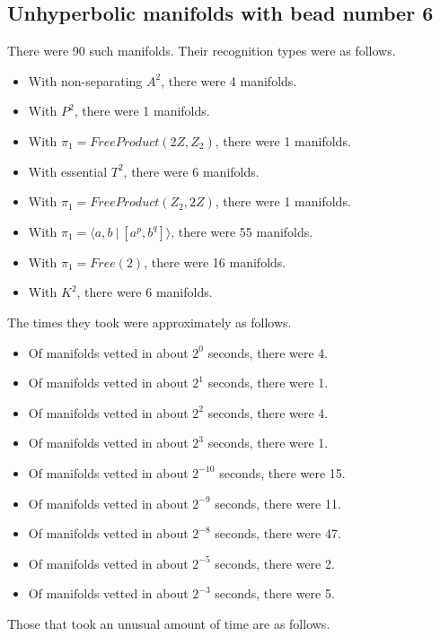 \documentclass{article}
\begin{document}
\subsection{Unhyperbolic manifolds with bead number 6}
There were 90 such manifolds.
Their recognition types were as follows.
\begin{itemize}
\item With non-separating $A^2$, there were 4 manifolds.
\item With $P^2$, there were 1 manifolds.
\item With $\pi_1 =FreeProduct( 2 Z, Z_2 )$, there were 1 manifolds.
\item With essential $T^2$, there were 6 manifolds.
\item With $\pi_1 =FreeProduct( Z_2, 2 Z )$, there were 1 manifolds.
\item With $\pi_1 = \langle a,b\ |\ [a^p,b^q]\rangle$, there were 55 manifolds.
\item With $\pi_1 =Free(2)$, there were 16 manifolds.
\item With $K^2$, there were 6 manifolds.
\end{itemize}
The times they took were approximately as follows.
\begin{itemize}
\item Of manifolds vetted in about $2^{0}$ seconds, there were 4.
\item Of manifolds vetted in about $2^{1}$ seconds, there were 1.
\item Of manifolds vetted in about $2^{2}$ seconds, there were 4.
\item Of manifolds vetted in about $2^{3}$ seconds, there were 1.
\item Of manifolds vetted in about $2^{-10}$ seconds, there were 15.
\item Of manifolds vetted in about $2^{-9}$ seconds, there were 11.
\item Of manifolds vetted in about $2^{-8}$ seconds, there were 47.
\item Of manifolds vetted in about $2^{-5}$ seconds, there were 2.
\item Of manifolds vetted in about $2^{-3}$ seconds, there were 5.
\end{itemize}
Those that took an unusual amount of time are as follows.
\end{document}
